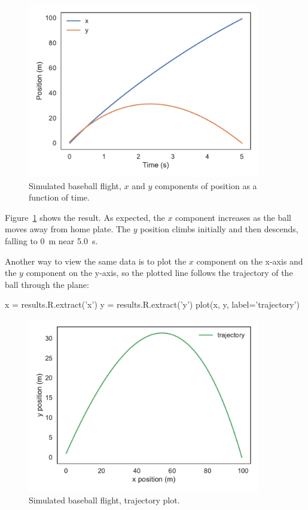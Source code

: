 \documentclass[12pt]{book}
\theoremstyle{exercise}
\begin{document}
\begin{figure}
\centerline{\includegraphics[height=3in]{figs/chap22-fig01.pdf}}
\caption{Simulated baseball flight, $x$ and $y$ components of position as a function of time.}
\label{chap22-fig01}
\end{figure}

Figure~\ref{chap22-fig01} shows the result.  As expected, the $x$ component increases as the ball moves away from home plate.  The $y$ position climbs initially and then descends, falling to \SI{0}{\meter} near \SI{5.0}{\second}.


Another way to view the same data is to plot the $x$ component on the x-axis and the $y$ component on the y-axis, so the plotted line follows the trajectory of the ball through the plane:

\begin{python}
x = results.R.extract('x')
y = results.R.extract('y')
plot(x, y, label='trajectory')
\end{python}

\begin{figure}
\centerline{\includegraphics[height=3in]{figs/chap22-fig02.pdf}}
\caption{Simulated baseball flight, trajectory plot.}
\label{chap22-fig02}
\end{figure}
\end{document}
